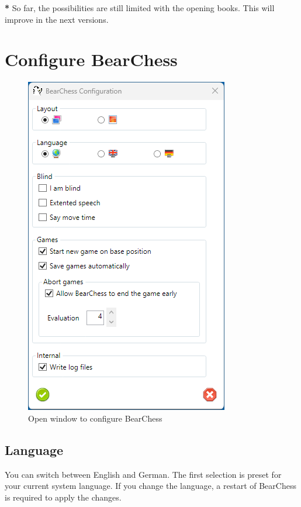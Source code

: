 \documentclass[11pt,a4paper]{article}
\begin{document}
	{\color{red}\textbf{*}} So far, the possibilities are still limited with the opening books. This will improve in the next versions. 
	
	\section{Configure BearChess} \label{ConfigureBearChess}
	
	\begin{figure}[H]
		\centering
		\includegraphics[scale=1.0]{ConfigureBearChess.png}
		\caption{Open window to configure BearChess}
		\label{fig:ConfigureBearChess}
	\end{figure}
	
	\subsection{Language}
	You can switch between English and German. The first selection is preset for your current system language.
	If you change the language, a restart of BearChess is required to apply the changes.
	
\end{document}
